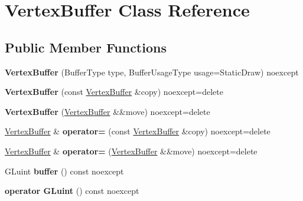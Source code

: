 \hypertarget{class_vertex_buffer}{}\section{Vertex\+Buffer Class Reference}
\label{class_vertex_buffer}
\subsection*{Public Member Functions}
\begin{DoxyCompactItemize}
\item 
\mbox{\label{class_vertex_buffer_afd1edec899e37e5579be2721dde01841}} 
{\bfseries Vertex\+Buffer} (Buffer\+Type type, Buffer\+Usage\+Type usage=Static\+Draw) noexcept
\item 
\mbox{\label{class_vertex_buffer_a93505c5a90ba907c584317bccd5728a0}} 
{\bfseries Vertex\+Buffer} (const \mbox{\hyperlink{class_vertex_buffer}{Vertex\+Buffer}} \&copy) noexcept=delete
\item 
\mbox{\label{class_vertex_buffer_aafc9b2b4e368cb8bbc89d50bc2a518fe}} 
{\bfseries Vertex\+Buffer} (\mbox{\hyperlink{class_vertex_buffer}{Vertex\+Buffer}} \&\&move) noexcept=delete
\item 
\mbox{\label{class_vertex_buffer_ad108c68aa5a370772e96d8aed5ab0949}} 
\mbox{\hyperlink{class_vertex_buffer}{Vertex\+Buffer}} \& {\bfseries operator=} (const \mbox{\hyperlink{class_vertex_buffer}{Vertex\+Buffer}} \&copy) noexcept=delete
\item 
\mbox{\label{class_vertex_buffer_ae1c7d13a52093040ea63d78d93812ad6}} 
\mbox{\hyperlink{class_vertex_buffer}{Vertex\+Buffer}} \& {\bfseries operator=} (\mbox{\hyperlink{class_vertex_buffer}{Vertex\+Buffer}} \&\&move) noexcept=delete
\item 
\mbox{\label{class_vertex_buffer_a3ed7ce3ece37e064d0c18d2635a63ffd}} 
G\+Luint {\bfseries buffer} () const noexcept
\item 
\mbox{\label{class_vertex_buffer_acf9dc6811d13e7ec759217add59ad7d3}} 
{\bfseries operator G\+Luint} () const noexcept
\item 

\end{DoxyCompactItemize}
